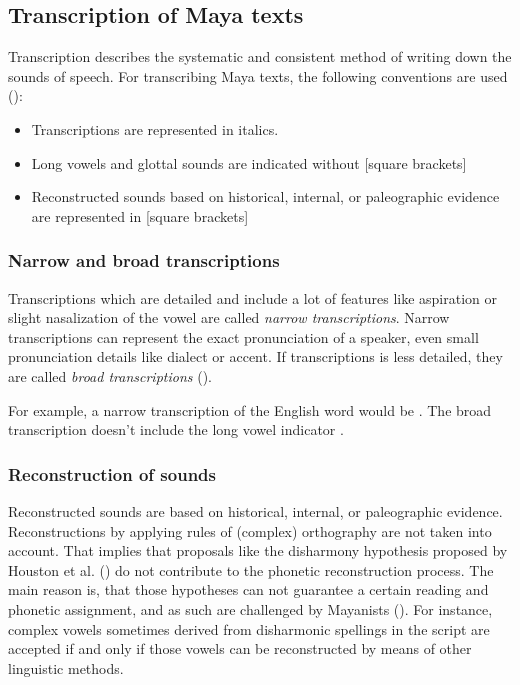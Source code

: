 \documentclass[../main.tex]{subfiles}
\begin{document}
\subsection{Transcription of Maya texts}
Transcription describes the systematic and consistent method of writing down the sounds of speech.
For transcribing Maya texts, the following conventions are used (\cite[14]{kettunenhelmke2020}):
\begin{itemize}
    \item Transcriptions are represented in italics.
    \item Long vowels and glottal sounds are indicated without [square brackets]
    \item Reconstructed sounds based on historical, internal, or paleographic evidence are 
          represented in [square brackets]
\end{itemize}

\subsubsection{Narrow and broad transcriptions}
Transcriptions which are detailed and include a lot of features like aspiration or 
slight nasalization of the vowel are called \emph{narrow transcriptions}.
Narrow transcriptions can represent the exact pronunciation of a speaker, even small pronunciation 
details like dialect or accent. 
If transcriptions is less detailed, 
they are called \emph{broad transcriptions} (\cite[490]{crystal2008}).

For example, a narrow transcription of the English word  would be 
.
The broad transcription  doesn't include 
the long vowel indicator \textipa{:}.

\subsubsection{Reconstruction of sounds}
Reconstructed sounds are based on historical, internal, or paleographic evidence.
Reconstructions by applying rules of (complex) orthography are not taken into account.
That implies that proposals like the disharmony hypothesis proposed by 
Houston et al. (\cites{lacadena2004}{houstonstuartrobertson1998}) do not contribute to the
phonetic reconstruction process.
The main reason is, that those hypotheses can not guarantee a certain reading and phonetic
assignment, and as such are challenged by Mayanists (\cite[7]{boot2009}).
For instance, complex vowels sometimes derived from disharmonic spellings in the script are
accepted if and only if those vowels can be reconstructed by means of other linguistic methods.
\end{document}
